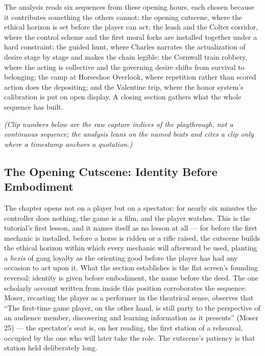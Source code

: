 \documentclass{article}
\begin{document}
The analysis reads six sequences from these opening hours, each chosen because it contributes something the others cannot: the opening cutscene, where the ethical horizon is set before the player can act; the leash and the Colter corridor, where the control scheme and the first moral forks are installed together under a hard constraint; the guided hunt, where Charles narrates the actualization of desire stage by stage and makes the chain legible; the Cornwall train robbery, where the acting is collective and the governing desire shifts from survival to belonging; the camp at Horseshoe Overlook, where repetition rather than scored action does the depositing; and the Valentine trip, where the honor system's calibration is put on open display. A closing section gathers what the whole sequence has built.

\textit{(Clip numbers below are the raw capture indices of the playthrough, not a continuous sequence; the analysis leans on the named beats and cites a clip only where a timestamp anchors a quotation.)}

\bigskip

\subsection*{The Opening Cutscene: Identity Before Embodiment}

The chapter opens not on a player but on a spectator: for nearly six minutes the controller does nothing, the game is a film, and the player watches. This is the tutorial's first lesson, and it names itself as no lesson at all — for before the first mechanic is installed, before a horse is ridden or a rifle raised, the cutscene builds the ethical horizon within which every mechanic will afterward be used, planting a \textit{hexis} of gang loyalty as the orienting good before the player has had any occasion to act upon it. What the section establishes is the flat screen's founding reversal: identity is given before embodiment, the name before the deed.
The one scholarly account written from inside this position corroborates the sequence: Moser, recasting the player as a performer in the theatrical sense, observes that ``The first-time game player, on the other hand, is still party to the perspective of an audience member, discovering and learning information as it presents'' (Moser 25) — the spectator's seat is, on her reading, the first station of a rehearsal, occupied by the one who will later take the role. The cutscene's patiency is that station held deliberately long.
\end{document}
